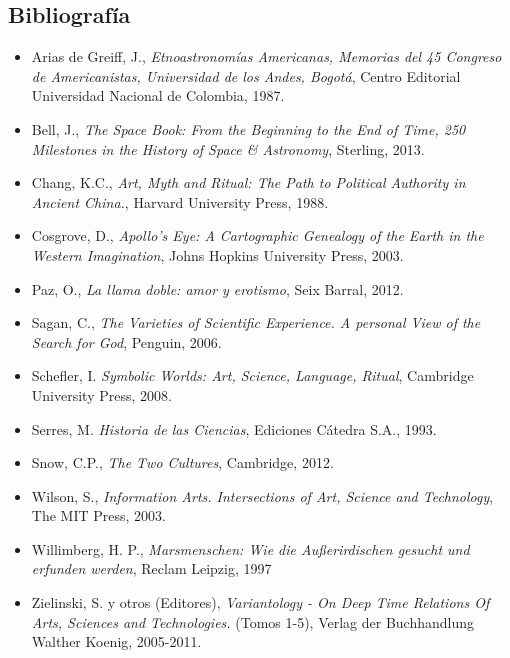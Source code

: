 \documentclass[12pt]{report}
\begin{document}
\subsection*{Bibliograf\'ia}

\begin{itemize}

\item Arias de Greiff, J., \emph{Etnoastronom\'ias Americanas, Memorias
del 45 Congreso de Americanistas, Universidad de los Andes, Bogot\'a},
  Centro Editorial Universidad Nacional de Colombia, 1987.

\item Bell, J., \emph{The Space Book: From the Beginning to the End of Time, 250
  Milestones in the History of Space \& Astronomy}, Sterling, 2013.

\item Chang, K.C., \emph{Art, Myth and Ritual: The Path to Political
  Authority in Ancient China.}, Harvard University Press, 1988.

\item Cosgrove, D., \emph{Apollo's Eye: A Cartographic Genealogy of
  the Earth in the Western Imagination}, Johns Hopkins University
  Press, 2003.

\item Paz, O., \emph{La llama doble: amor y erotismo}, Seix Barral, 2012.

\item Sagan, C., \emph{The Varieties of Scientific Experience. A personal View of the Search for God}, Penguin, 2006.

\item Schefler, I. \emph{Symbolic Worlds: Art, Science, Language,
  Ritual}, Cambridge University Press, 2008.

\item Serres, M. \emph{Historia de las Ciencias}, Ediciones C\'atedra
  S.A., 1993. 

\item Snow, C.P., \emph{The Two Cultures}, Cambridge, 2012.

\item Wilson, S., \emph{Information Arts. Intersections of Art, Science
and Technology}, The MIT Press, 2003.

\item Willimberg, H. P., \emph{Marsmenschen:  Wie die Au\ss erirdischen
  gesucht und erfunden werden}, Reclam Leipzig, 1997

\item Zielinski, S. y otros (Editores), \emph{Variantology - On Deep Time
  Relations Of Arts, Sciences and Technologies.} (Tomos 1-5), Verlag
der Buchhandlung Walther Koenig, 2005-2011.  

\end{itemize}
\end{document}

